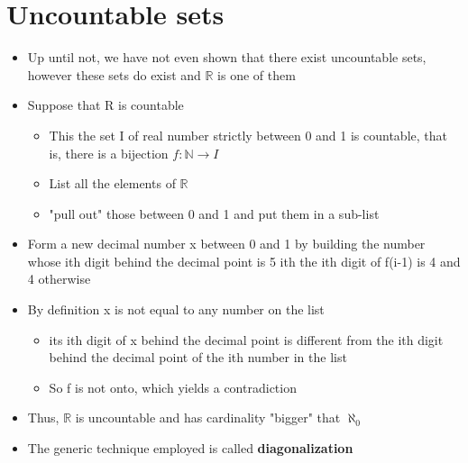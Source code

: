 \documentclass{article}[18pt]
\begin{document}
\section{Uncountable sets}
\begin{itemize}
	\item Up until not, we have not even shown that there exist uncountable sets, however these sets do exist and $\mathbb{R}$ is one of them
	\item Suppose that R is countable
	\begin{itemize}
		\item This the set I of real number strictly between 0 and 1 is countable, that is, there is a bijection $f:\mathbb{N}\rightarrow I$
		\item List all the elements of $\mathbb{R}$
		\item "pull out" those between 0 and 1 and put them in a sub-list
	\end{itemize}
	\item Form a new decimal number x between 0 and 1 by building the number whose ith digit behind the decimal point is 5 ith the ith digit of f(i-1) is 4 and 4 otherwise
	\item By definition x is not equal to any number on the list
	\begin{itemize}
		\item its ith digit of x behind the decimal point is different from the ith digit behind the decimal point of the ith number in the list
		\item So f is not onto, which yields a contradiction
	\end{itemize}
	\item Thus, $\mathbb{R}$ is uncountable and has cardinality "bigger" that $\aleph_0$
	\item The generic technique employed is called \textbf{diagonalization}
\end{itemize}
\end{document}

